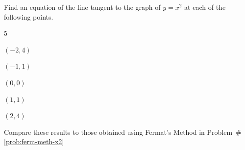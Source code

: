 \begin{ProficiencyDrill}
  Find an equation of the line tangent to the graph of $y=x^2$ at
  each of the following points.
  \begin{enumerate}[label={\bf{}(\alph*)}]
    \begin{multicols}{5}
    \item $(-2,4)$
    \item $(-1,1)$
    \item $(0,0)$
    \item $(1,1)$
    \item $(2,4)$
    \end{multicols}
  \end{enumerate}
    Compare these results to those obtained using Fermat's Method in
  Problem~\#\ref{prob:ferm-meth-x2}
\end{ProficiencyDrill}

